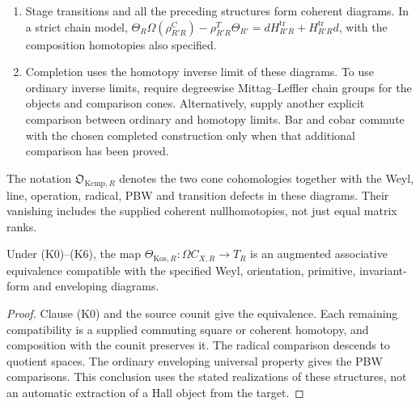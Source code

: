 \begin{definition}
\begin{enumerate}
pieces of Proposition~\ref{prop:bkm-finite-filtered-pbw}.
\item[\textup{(K6)}] Stage transitions and all the preceding
structures form coherent diagrams. In a strict chain model,
$\Theta_R\Omega(\rho^C_{R'R})-\rho^T_{R'R}\Theta_{R'}
=dH^{\mathrm{tr}}_{R'R}+H^{\mathrm{tr}}_{R'R}d$, with the
composition homotopies also specified.
\item[\textup{(K7)}] Completion uses the homotopy inverse limit
of these diagrams. To use ordinary inverse limits, require degreewise Mittag--Leffler
chain groups for the objects and comparison cones. Alternatively,
supply another explicit comparison between ordinary and homotopy
limits. Bar and cobar
commute with the chosen completed construction only when that
additional comparison has been proved.
\end{enumerate}
The notation $\mathfrak O_{\mathrm{Kcmp},R}$ denotes the two cone
cohomologies together with the Weyl, line, operation, radical, PBW
and transition defects in these diagrams. Their vanishing includes
the supplied coherent nullhomotopies, not just equal matrix ranks.
\end{definition}

\begin{proposition}
\label{prop:finite-koszul-comparison-compatibility}
Under \textup{(K0)--(K6)}, the map
$\Theta_{\mathrm{Kos},R}:\Omega C_{X,R}\to T_R$ is an augmented
associative equivalence compatible with the specified Weyl,
orientation, primitive, invariant-form and enveloping diagrams.
\end{proposition}
\begin{proof}
Clause (K0) and the source counit give the equivalence.
Each remaining compatibility is a supplied commuting square or
coherent homotopy, and composition with the counit preserves it.
The radical comparison descends to quotient spaces. The ordinary
enveloping universal property gives the PBW comparisons.
This conclusion uses the stated realizations of these structures,
not an automatic extraction of a Hall object from the target.
\end{proof}


